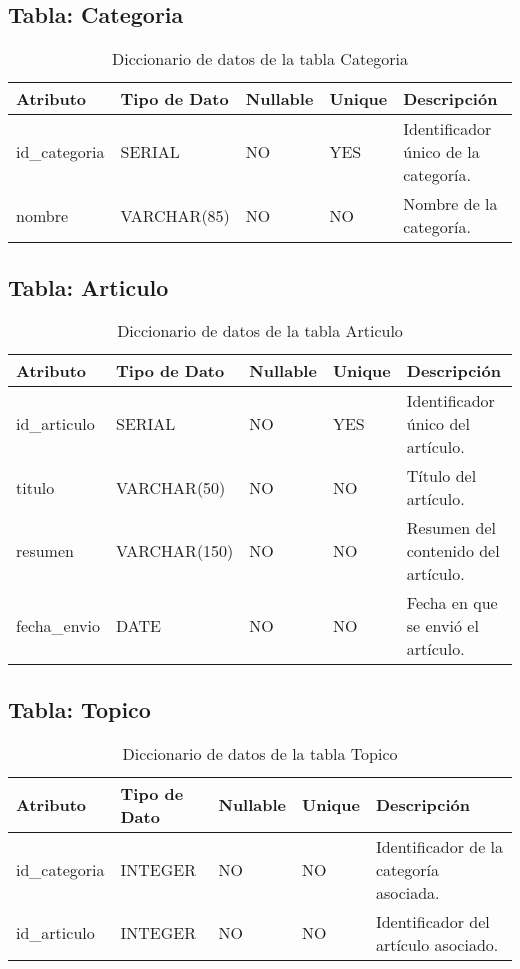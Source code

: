 \documentclass{article}
\begin{document}
\subsection{Tabla: Categoria}
\begin{table}[H]
\centering
\begin{tabular}{|l|l|l|l|p{6cm}|}
\hline
\textbf{Atributo} & \textbf{Tipo de Dato} & \textbf{Nullable} & \textbf{Unique} & \textbf{Descripción} \\ \hline
id\_categoria & SERIAL & NO & YES & Identificador único de la categoría. \\ \hline
nombre & VARCHAR(85) & NO & NO & Nombre de la categoría. \\ \hline
\end{tabular}
\caption{Diccionario de datos de la tabla Categoria}
\label{tab:categoria}
\end{table}

\subsection{Tabla: Articulo}
\begin{table}[H]
\centering
\begin{tabular}{|l|l|l|l|p{6cm}|}
\hline
\textbf{Atributo} & \textbf{Tipo de Dato} & \textbf{Nullable} & \textbf{Unique} & \textbf{Descripción} \\ \hline
id\_articulo & SERIAL & NO & YES & Identificador único del artículo. \\ \hline
titulo & VARCHAR(50) & NO & NO & Título del artículo. \\ \hline
resumen & VARCHAR(150) & NO & NO & Resumen del contenido del artículo. \\ \hline
fecha\_envio & DATE & NO & NO & Fecha en que se envió el artículo. \\ \hline
\end{tabular}
\caption{Diccionario de datos de la tabla Articulo}
\label{tab:articulo}
\end{table}

\subsection{Tabla: Topico}
\begin{table}[H]
\centering
\begin{tabular}{|l|l|l|l|p{6cm}|}
\hline
\textbf{Atributo} & \textbf{Tipo de Dato} & \textbf{Nullable} & \textbf{Unique} & \textbf{Descripción} \\ \hline
id\_categoria & INTEGER & NO & NO & Identificador de la categoría asociada. \\ \hline
id\_articulo & INTEGER & NO & NO & Identificador del artículo asociado. \\ \hline
\end{tabular}
\caption{Diccionario de datos de la tabla Topico}
\label{tab:topico}
\end{table}
\end{document}
